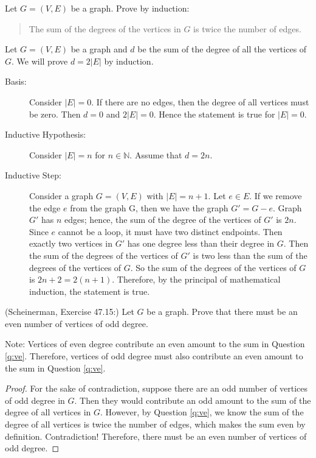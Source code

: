 \documentclass{article}
\newcommand{\N}{\mathbb{N}}
\theoremstyle{definition}
\begin{document}
\begin{question}\label{q:ve}
     Let $G=(V,E)$ be a graph. Prove by induction: 
\begin{quote}
The sum of the degrees of the vertices in $G$ is twice the number of edges.
\end{quote}	
\end{question}
\begin{solution}
Let $G=(V,E)$ be a graph and $d$ be the sum of the degree of all the vertices of $G$. We will prove $d=2|E|$ by induction.
\begin{description}
\item[Basis:] Consider $|E|=0$. If there are no edges, then the degree of all vertices must be zero. Then $d=0$ and $2|E|=0$. Hence the statement is true for $|E|=0$.
\item[Inductive Hypothesis:] Consider $|E|=n$ for $n\in \N$. Assume that $d=2n$.
\item[Inductive Step:] Consider a graph $G=(V,E)$ with $|E|=n+1$. Let $e\in E$. If we remove the edge $e$ from the graph G, then we have the graph $G'=G-e$. Graph $G'$ has $n$ edges; hence, the sum of the degree of the vertices of $G'$ is $2n$. Since $e$ cannot be a loop, it must have two distinct endpoints. Then exactly two vertices in $G'$ has one degree less than their degree in $G$. Then the sum of the degrees of the vertices of $G'$ is two less than the sum of the degrees of the vertices of $G$. So the sum of the degrees of the vertices of $G$ is $2n+2=2(n+1)$.
Therefore, by the principal of mathematical induction, the statement is true.
\end{description}
\end{solution}

\begin{question}
    (Scheinerman, Exercise 47.15:)
    Let $G$ be a graph. Prove that there must be an even number of vertices of odd degree.
\end{question}
\begin{solution}
Note: Vertices of even degree contribute an even amount to the sum in Question \ref{q:ve}. Therefore, vertices of odd degree must also contribute an even amount to the sum in Question \ref{q:ve}.
\begin{proof}
For the sake of contradiction, suppose there are an odd number of vertices of odd degree in $G$. Then they would contribute an odd amount to the sum of the degree of all vertices in $G$. However, by Question \ref{q:ve}, we know the sum of the degree of all vertices is twice the number of edges, which makes the sum even by definition. Contradiction! Therefore, there must be an even number of vertices of odd degree.
\end{proof} 
\end{solution}
\end{document}
